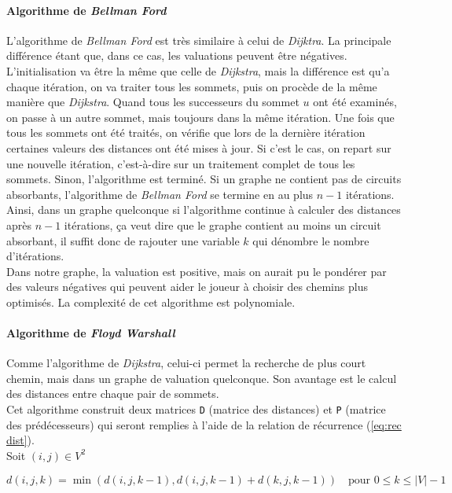 \documentclass[a4paper, 12pt]{article}
\begin{document}
\paragraph{Algorithme de \emph{Bellman Ford}}
L'algorithme de \emph{Bellman Ford} est très similaire à celui de \emph{Dijktra}. La principale différence étant que, dans ce cas, les valuations peuvent être négatives.
L'initialisation va être la même que celle de \emph{Dijkstra}, mais la différence est qu'a chaque itération, on va traiter tous les sommets, puis on procède de la même manière que \emph{Dijkstra}.
Quand tous les successeurs du sommet $u$ ont été examinés, on passe à un autre sommet, mais toujours dans la même itération.
Une fois que tous les sommets ont été traités, on vérifie que lors de la dernière itération certaines valeurs des distances ont été mises à jour. Si c'est le cas, on repart sur une nouvelle itération, c'est-à-dire sur un traitement complet de tous les sommets. Sinon, l'algorithme est terminé.
Si un graphe ne contient pas de circuits absorbants, l'algorithme de \emph{Bellman Ford} se termine en au plus $n-1$ itérations. Ainsi, dans un graphe quelconque si l'algorithme continue à calculer des distances après $n-1$ itérations, ça veut dire que le graphe contient au moins un circuit absorbant, il suffit donc de rajouter une variable $k$ qui dénombre le nombre d'itérations.\\
Dans notre graphe, la valuation est positive, mais on aurait pu le pondérer par des valeurs négatives qui peuvent aider le joueur à choisir des chemins plus optimisés. La complexité de cet algorithme est polynomiale.

\paragraph{Algorithme de \emph{Floyd Warshall}}
Comme l'algorithme de \emph{Dijkstra}, celui-ci permet la recherche de plus court chemin, mais dans un graphe de valuation quelconque. Son avantage est le calcul des distances entre chaque pair de sommets.\\
Cet algorithme construit deux matrices \texttt{D} (matrice des distances) et \texttt{P} (matrice des prédécesseurs) qui seront remplies à l'aide de la relation de récurrence (\ref{eq:rec dist}).\\
Soit $(i,j)\in V^2$

\begin{equation}
  d(i,j,k) = \min(d(i,j,k-1), d(i,j,k-1) + d(k,j,k-1))\quad \text{pour $0\leq k\leq |V|-1$}
  \label{eq:rec dist}
\end{equation}
\end{document}
